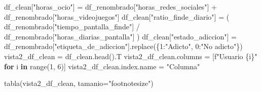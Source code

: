 \documentclass[11pt,spanish,a4paper,]{article}
\newenvironment{Shaded}{\begin{snugshade}}{\end{snugshade}}
\newcommand{\BuiltInTok}[1]{\textcolor[rgb]{0.00,0.23,0.31}{#1}}
\newcommand{\ControlFlowTok}[1]{\textcolor[rgb]{0.00,0.23,0.31}{\textbf{#1}}}
\newcommand{\DecValTok}[1]{\textcolor[rgb]{0.68,0.00,0.00}{#1}}
\newcommand{\KeywordTok}[1]{\textcolor[rgb]{0.00,0.23,0.31}{\textbf{#1}}}
\newcommand{\NormalTok}[1]{\textcolor[rgb]{0.00,0.23,0.31}{#1}}
\newcommand{\OperatorTok}[1]{\textcolor[rgb]{0.37,0.37,0.37}{#1}}
\newcommand{\SpecialCharTok}[1]{\textcolor[rgb]{0.37,0.37,0.37}{#1}}
\newcommand{\SpecialStringTok}[1]{\textcolor[rgb]{0.13,0.47,0.30}{#1}}
\newcommand{\StringTok}[1]{\textcolor[rgb]{0.13,0.47,0.30}{#1}}
\begin{document}
\begin{Shaded}
\begin{Highlighting}[]
\NormalTok{df\_clean[}\StringTok{"horas\_ocio"}\NormalTok{] }\OperatorTok{=}\NormalTok{ df\_renombrado[}\StringTok{"horas\_redes\_sociales"}\NormalTok{] }\OperatorTok{+}\NormalTok{ df\_renombrado[}\StringTok{"horas\_videojuegos"}\NormalTok{]}
\NormalTok{df\_clean[}\StringTok{"ratio\_finde\_diario"}\NormalTok{] }\OperatorTok{=}\NormalTok{ (}
\NormalTok{    df\_renombrado[}\StringTok{"tiempo\_pantalla\_finde"}\NormalTok{]}
    \OperatorTok{/}\NormalTok{ df\_renombrado[}\StringTok{"horas\_diarias\_pantalla"}\NormalTok{]}
\NormalTok{)}
\NormalTok{df\_clean[}\StringTok{"estado\_adiccion"}\NormalTok{] }\OperatorTok{=}\NormalTok{ df\_renombrado[}\StringTok{"etiqueta\_de\_adiccion"}\NormalTok{].replace(\{}\DecValTok{1}\NormalTok{:}\StringTok{"Adicto"}\NormalTok{, }\DecValTok{0}\NormalTok{:}\StringTok{"No adicto"}\NormalTok{\})}
\NormalTok{vista2\_df\_clean }\OperatorTok{=}\NormalTok{ df\_clean.head().T}
\NormalTok{vista2\_df\_clean.columns }\OperatorTok{=}\NormalTok{ [}\SpecialStringTok{f"Usuario }\SpecialCharTok{\{}\NormalTok{i}\SpecialCharTok{\}}\SpecialStringTok{"} \ControlFlowTok{for}\NormalTok{ i }\KeywordTok{in} \BuiltInTok{range}\NormalTok{(}\DecValTok{1}\NormalTok{, }\DecValTok{6}\NormalTok{)]}
\NormalTok{vista2\_df\_clean.index.name }\OperatorTok{=} \StringTok{"Columna"}

\NormalTok{tabla(vista2\_df\_clean, tamanio}\OperatorTok{=}\StringTok{"footnotesize"}\NormalTok{)}
\end{Highlighting}
\end{Shaded}
\end{document}
